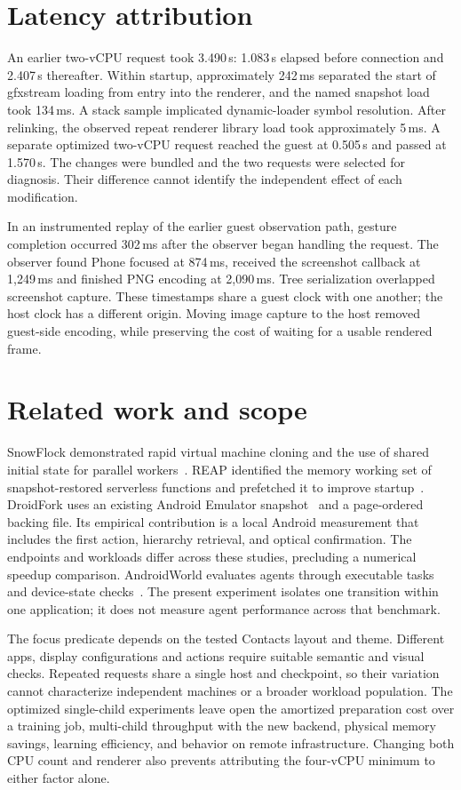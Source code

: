 \documentclass[11pt,letterpaper]{article}
\newcommand{\unit}[1]{#1\,s}
\begin{document}
\clearpage
\section{Latency attribution}
An earlier two-vCPU request took \unit{3.490}: \unit{1.083} elapsed before connection and \unit{2.407} thereafter. Within startup, approximately 242\,ms separated the start of gfxstream loading from entry into the renderer, and the named snapshot load took 134\,ms. A stack sample implicated dynamic-loader symbol resolution. After relinking, the observed repeat renderer library load took approximately 5\,ms. A separate optimized two-vCPU request reached the guest at \unit{0.505} and passed at \unit{1.570}. The changes were bundled and the two requests were selected for diagnosis. Their difference cannot identify the independent effect of each modification.

In an instrumented replay of the earlier guest observation path, gesture completion occurred 302\,ms after the observer began handling the request. The observer found Phone focused at 874\,ms, received the screenshot callback at 1,249\,ms and finished PNG encoding at 2,090\,ms. Tree serialization overlapped screenshot capture. These timestamps share a guest clock with one another; the host clock has a different origin. Moving image capture to the host removed guest-side encoding, while preserving the cost of waiting for a usable rendered frame.

\section{Related work and scope}
SnowFlock demonstrated rapid virtual machine cloning and the use of shared initial state for parallel workers~\cite{snowflock}. REAP identified the memory working set of snapshot-restored serverless functions and prefetched it to improve startup~\cite{reap}. DroidFork uses an existing Android Emulator snapshot~\cite{snapshot} and a page-ordered backing file. Its empirical contribution is a local Android measurement that includes the first action, hierarchy retrieval, and optical confirmation. The endpoints and workloads differ across these studies, precluding a numerical speedup comparison. AndroidWorld evaluates agents through executable tasks and device-state checks~\cite{androidworld}. The present experiment isolates one transition within one application; it does not measure agent performance across that benchmark.

The focus predicate depends on the tested Contacts layout and theme. Different apps, display configurations and actions require suitable semantic and visual checks. Repeated requests share a single host and checkpoint, so their variation cannot characterize independent machines or a broader workload population. The optimized single-child experiments leave open the amortized preparation cost over a training job, multi-child throughput with the new backend, physical memory savings, learning efficiency, and behavior on remote infrastructure. Changing both CPU count and renderer also prevents attributing the four-vCPU minimum to either factor alone.
\end{document}
